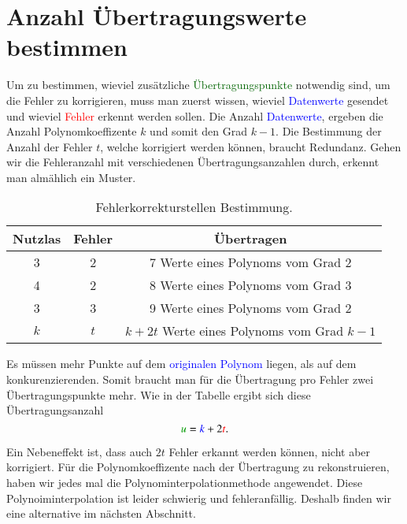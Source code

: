 \section{Anzahl Übertragungswerte bestimmen
\label{reedsolomon:section:Fehlerkorrekturstellen}}
Um zu bestimmen, wieviel zusätzliche \textcolor{darkgreen}{Übertragungspunkte} notwendig sind, um die Fehler zu korrigieren,
    muss man zuerst wissen, wieviel \textcolor{blue}{Datenwerte} gesendet und wieviel \textcolor{red}{Fehler} erkennt werden sollen. 
Die Anzahl \textcolor{blue}{Datenwerte}, ergeben die Anzahl Polynomkoeffizente $k$ und somit den Grad $k-1$.
Die Bestimmung der Anzahl der Fehler $t$, welche korrigiert werden können, braucht Redundanz.
Gehen wir die Fehleranzahl mit verschiedenen Übertragungsanzahlen durch, 
    erkennt man almählich ein Muster.
\begin{table}%
    \centering
    \begin{tabular}{ c c | c} 
        \hline
        Nutzlas & Fehler & Übertragen \\
        \hline 
        3 & 2 & 7 Werte eines Polynoms vom Grad 2 \\ 
        4 & 2 & 8 Werte eines Polynoms vom Grad 3 \\
        3 & 3 & 9 Werte eines Polynoms vom Grad 2 \\ 
        \hline
        $k$ & $t$ & $k+2t$ Werte eines Polynoms vom Grad $k-1$ \\ 
        \hline
    \end{tabular}
    \caption{ Fehlerkorrekturstellen Bestimmung.}
    \label{tab:fehlerkorrekturstellen}
\end{table}
Es müssen mehr Punkte auf dem \textcolor{blue}{originalen Polynom} liegen, als auf dem konkurenzierenden.
Somit braucht man für die Übertragung pro Fehler zwei Übertragungspunkte mehr.
Wie in der Tabelle ergibt sich diese Übertragungsanzahl
\begin{equation}
    \textcolor{darkgreen}{u}=
    \textcolor{blue}{k}+2\textcolor{red}{t}.
    \label{reedsolomon:equation2}
\end{equation}

Ein Nebeneffekt ist, dass auch $2t$ Fehler erkannt werden können, nicht aber korrigiert.
Für die Polynomkoeffizente nach der Übertragung zu rekonstruieren, 
    haben wir jedes mal die Polynominterpolationmethode angewendet.
Diese Polynoiminterpolation ist leider schwierig und fehleranfällig.
Deshalb finden wir eine alternative im nächsten Abschnitt.

